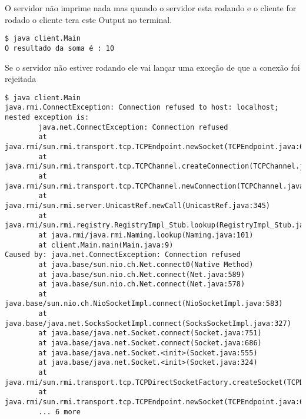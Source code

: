 \documentclass[12pt]{article}
\begin{document}
O servidor não imprime nada mas quando o servidor esta rodando e o cliente for rodado
o cliente tera este Output no terminal.

\begin{Verbatim}
$ java client.Main 
O resultado da soma é : 10
\end{Verbatim}

Se o servidor não estiver rodando ele vai lançar uma exceção de que a conexão foi rejeitada

\begin{Verbatim}[breaklines=true, breakanywhere=true]
$ java client.Main
java.rmi.ConnectException: Connection refused to host: localhost; nested exception is: 
        java.net.ConnectException: Connection refused
        at java.rmi/sun.rmi.transport.tcp.TCPEndpoint.newSocket(TCPEndpoint.java:625)
        at java.rmi/sun.rmi.transport.tcp.TCPChannel.createConnection(TCPChannel.java:217)
        at java.rmi/sun.rmi.transport.tcp.TCPChannel.newConnection(TCPChannel.java:204)
        at java.rmi/sun.rmi.server.UnicastRef.newCall(UnicastRef.java:345)
        at java.rmi/sun.rmi.registry.RegistryImpl_Stub.lookup(RegistryImpl_Stub.java:116)
        at java.rmi/java.rmi.Naming.lookup(Naming.java:101)
        at client.Main.main(Main.java:9)
Caused by: java.net.ConnectException: Connection refused
        at java.base/sun.nio.ch.Net.connect0(Native Method)
        at java.base/sun.nio.ch.Net.connect(Net.java:589)
        at java.base/sun.nio.ch.Net.connect(Net.java:578)
        at java.base/sun.nio.ch.NioSocketImpl.connect(NioSocketImpl.java:583)
        at java.base/java.net.SocksSocketImpl.connect(SocksSocketImpl.java:327)
        at java.base/java.net.Socket.connect(Socket.java:751)
        at java.base/java.net.Socket.connect(Socket.java:686)
        at java.base/java.net.Socket.<init>(Socket.java:555)
        at java.base/java.net.Socket.<init>(Socket.java:324)
        at java.rmi/sun.rmi.transport.tcp.TCPDirectSocketFactory.createSocket(TCPDirectSocketFactory.java:40)
        at java.rmi/sun.rmi.transport.tcp.TCPEndpoint.newSocket(TCPEndpoint.java:619)
        ... 6 more
\end{Verbatim}
\end{document}
